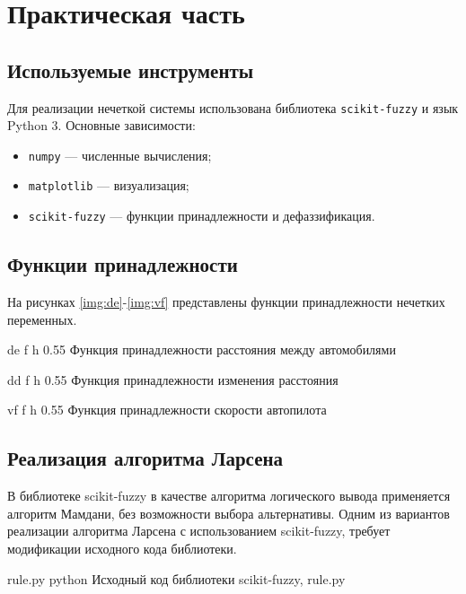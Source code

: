 \chapter{Практическая часть}

\section{Используемые инструменты}

Для реализации нечеткой системы использована библиотека \texttt{scikit-fuzzy} и язык
 Python 3.  
Основные зависимости:
\begin{itemize}
    \item \texttt{numpy} — численные вычисления;
    \item \texttt{matplotlib} — визуализация;
    \item \texttt{scikit-fuzzy} — функции принадлежности и дефаззификация.
\end{itemize}

\section{Функции принадлежности}

На рисунках \ref{img:de}-\ref{img:vf} представлены функции 
принадлежности нечетких переменных.

        {de}
        {f}
        {h}
        {0.55\textwidth}
        {Функция принадлежности расстояния между автомобилями}

        {dd}
        {f}
        {h}
        {0.55\textwidth}
        {Функция принадлежности изменения расстояния}

        {vf}
        {f}
        {h}
        {0.55\textwidth}
        {Функция принадлежности скорости автопилота}

        \newpage

\section{Реализация алгоритма Ларсена}

В библиотеке scikit-fuzzy в качестве алгоритма логического вывода применяется
алгоритм Мамдани, без возможности выбора альтернативы. 
Одним из вариантов реализации алгоритма Ларсена с использованием
scikit-fuzzy, требует модификации исходного кода библиотеки.

{rule.py} %
{python} %
{Исходный код библиотеки scikit-fuzzy, rule.py} %

